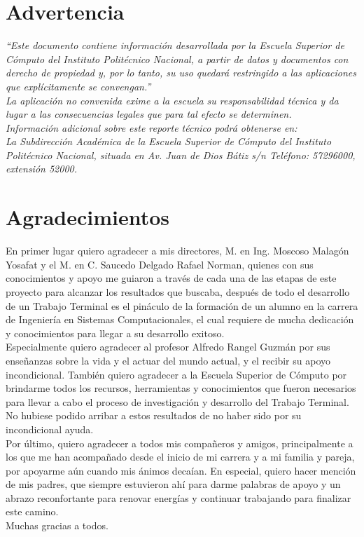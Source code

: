 \documentclass[11pt]{report}
\begin{document}
\newpage	
\section*{Advertencia}
\vfill
\textit{“Este documento contiene información desarrollada por la Escuela Superior de Cómputo del Instituto Politécnico Nacional, a partir de datos y documentos con derecho de propiedad y, por lo tanto, su uso quedará restringido a las aplicaciones que explícitamente se convengan.”
\\
La aplicación no convenida exime a la escuela su responsabilidad técnica y da lugar a las consecuencias legales que para tal efecto se determinen. 
\\
Información adicional sobre este reporte técnico podrá obtenerse en: 
\\
La Subdirección Académica de la Escuela Superior de Cómputo del Instituto Politécnico Nacional, situada en Av. Juan de Dios Bátiz s/n Teléfono: 57296000, extensión 52000.}
\vfill

\newpage
\section*{Agradecimientos}
\vfill
En primer lugar quiero agradecer a mis directores, M. en Ing. Moscoso Malagón Yosafat y el M. en C. Saucedo Delgado Rafael Norman, quienes con sus conocimientos y apoyo me guiaron a través de cada una de las etapas de este proyecto para alcanzar los resultados que buscaba, después de todo el  desarrollo de un Trabajo Terminal es el pináculo de  la formación de un alumno en la carrera de Ingeniería en Sistemas Computacionales, el cual requiere de mucha dedicación y conocimientos para llegar a su desarrollo exitoso.
\\
\newline
Especialmente quiero agradecer al profesor Alfredo Rangel Guzmán por sus enseñanzas sobre la vida y el actuar del mundo actual, y el recibir su apoyo incondicional.
También quiero agradecer a la Escuela Superior de Cómputo por brindarme todos los recursos, herramientas y conocimientos que fueron necesarios para llevar a cabo el proceso de investigación y desarrollo del Trabajo Terminal. No hubiese podido arribar a estos resultados de no haber sido por su incondicional ayuda.
\\
\newline
Por último, quiero agradecer a todos mis compañeros y amigos, principalmente a los que me han acompañado desde el inicio de mi carrera y a mi familia y pareja, por apoyarme aún cuando mis ánimos decaían. En especial, quiero hacer mención de mis padres, que siempre estuvieron ahí para darme palabras de apoyo y un abrazo reconfortante para renovar energías y continuar trabajando para finalizar este camino.
\\
\newline
Muchas gracias a todos.
\\
\end{document}
